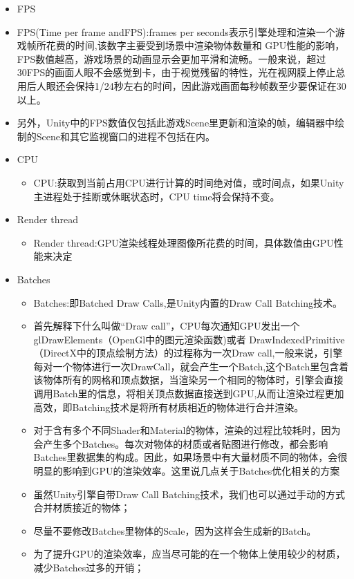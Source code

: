 \documentclass[9pt, b5paper]{article}
\begin{document}
\begin{itemize}
\item FPS
\item FPS(Time per frame andFPS):frames per seconds表示引擎处理和渲染一个游戏帧所花费的时间,该数字主要受到场景中渲染物体数量和 GPU性能的影响，FPS数值越高，游戏场景的动画显示会更加平滑和流畅。一般来说，超过30FPS的画面人眼不会感觉到卡，由于视觉残留的特性，光在视网膜上停止总用后人眼还会保持1/24秒左右的时间，因此游戏画面每秒帧数至少要保证在30以上。
\item 另外，Unity中的FPS数值仅包括此游戏Scene里更新和渲染的帧，编辑器中绘制的Scene和其它监视窗口的进程不包括在内。
\item CPU
\begin{itemize}
\item CPU:获取到当前占用CPU进行计算的时间绝对值，或时间点，如果Unity主进程处于挂断或休眠状态时，CPU time将会保持不变。
\end{itemize}
\item Render thread
\begin{itemize}
\item Render thread:GPU渲染线程处理图像所花费的时间，具体数值由GPU性能来决定
\end{itemize}
\item Batches
\begin{itemize}
\item Batches:即Batched Draw Calls,是Unity内置的Draw Call Batching技术。
\item 首先解释下什么叫做“Draw call”，CPU每次通知GPU发出一个glDrawElements（OpenGl中的图元渲染函数)或者 DrawIndexedPrimitive（DirectX中的顶点绘制方法）的过程称为一次Draw call,一般来说，引擎每对一个物体进行一次DrawCall，就会产生一个Batch,这个Batch里包含着该物体所有的网格和顶点数据，当渲染另一个相同的物体时，引擎会直接调用Batch里的信息，将相关顶点数据直接送到GPU,从而让渲染过程更加高效，即Batching技术是将所有材质相近的物体进行合并渲染。
\item 对于含有多个不同Shader和Material的物体，渲染的过程比较耗时，因为会产生多个Batches。每次对物体的材质或者贴图进行修改，都会影响Batches里数据集的构成。因此，如果场景中有大量材质不同的物体，会很明显的影响到GPU的渲染效率。这里说几点关于Batches优化相关的方案
\item 虽然Unity引擎自带Draw Call Batching技术，我们也可以通过手动的方式合并材质接近的物体；
\item 尽量不要修改Batches里物体的Scale，因为这样会生成新的Batch。
\item 为了提升GPU的渲染效率，应当尽可能的在一个物体上使用较少的材质，减少Batches过多的开销；

\end{itemize}
\end{itemize}
\end{document}
